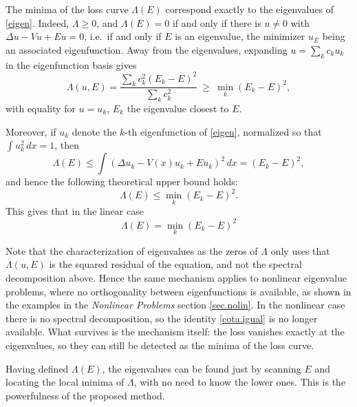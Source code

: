 \documentclass[11pt]{amsart}
\theoremstyle{definition}
\theoremstyle{remark}
\theoremstyle{plain}
\begin{document}
The minima of the loss curve $\Lambda(E)$ correspond exactly to the eigenvalues of \eqref{eigen}.
Indeed, $\Lambda\ge 0$, and $\Lambda(E)=0$ if and only if there is $u\neq 0$ with
$\Delta u-Vu+Eu=0$, i.e.\ if and only if $E$ is an eigenvalue, the minimizer $u_E$ being an associated eigenfunction.
Away from the eigenvalues, expanding $u=\sum_k c_k u_k$ in the eigenfunction basis gives
\[
\Lambda(u,E)=\frac{\sum_k c_k^2 (E_k-E)^2}{\sum_k c_k^2}\ \ge\ \min_k (E_k-E)^2,
\]
with equality for $u=u_k$, $E_k$ the eigenvalue closest to $E$.

Moreover,
if $u_k$ denote the $k$-th eigenfunction of \eqref{eigen}, normalized so that
$\int u_k^2\,dx=1$, then
\[
\Lambda(E)\le \int (\Delta u_k - V(x) u_k + Eu_k)^2\, dx = (E_k-E)^2 ,
\]
and hence the following theoretical upper bound holds:
\begin{equation} \label{cota.sup}
\Lambda(E)\le \min_k (E_k-E)^2.
\end{equation}
This gives that in the linear case
\begin{equation} \label{cota.igual}
\Lambda(E)=\min_k (E_k-E)^2
\end{equation}



Note that the characterization of eigenvalues as the zeros of $\Lambda$ only uses that
$\Lambda(u,E)$ is the squared residual of the equation, and not the spectral decomposition
above. Hence the same mechanism applies to nonlinear eigenvalue problems, where no
orthogonality between eigenfunctions is available, as shown in the examples in the \emph{Nonlinear Problems} section \ref{sec.nolin}. In the nonlinear case there is no spectral decomposition, so the identity
\eqref{cota.igual} is no longer available. What survives is the mechanism
itself: the loss vanishes exactly at the eigenvalues, so they can still be
detected as the minima of the loss curve.

Having defined $\Lambda(E)$, the eigenvalues can be found just by scanning $E$ and locating the local minima of $\Lambda$,
with no need to know the lower ones. This is the powerfulness of the proposed method.


%
\end{document}
